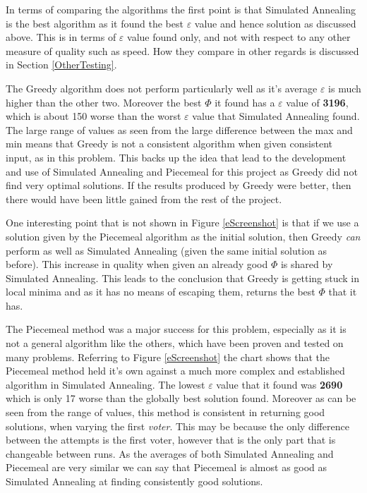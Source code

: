 \documentclass[12pt]{report}
\begin{document}
In terms of comparing the algorithms the first point is that Simulated Annealing is the best algorithm as it found the best $\varepsilon$ value and hence solution as discussed above. This is in terms of $\varepsilon$ value found only, and not with respect to any other measure of quality such as speed. How they compare in other regards is discussed in Section \ref{OtherTesting}.

The Greedy algorithm does not perform particularly well as it's average $\varepsilon$ is much higher than the other two. Moreover the best $\Phi$ it found has a $\varepsilon$ value of \textbf{3196}, which is about 150 worse than the worst $\varepsilon$ value that Simulated Annealing found. The large range of values as seen from the large difference between the max and min means that Greedy is not a consistent algorithm when given consistent input, as in this problem. This backs up the idea that lead to the development and use of Simulated Annealing and Piecemeal for this project as Greedy did not find very optimal solutions. If the results produced by Greedy were better, then there would have been little gained from the rest of the project. 

One interesting point that is not shown in Figure \ref{eScreenshot} is that if we use a solution given by the Piecemeal algorithm as the initial solution, then Greedy \textit{can} perform as well as Simulated Annealing (given the same initial solution as before). This increase in quality when given an already good $\Phi$ is shared by Simulated Annealing. This leads to the conclusion that Greedy is getting stuck in local minima and as it has no means of escaping them, returns the best $\Phi$ that it has.

The Piecemeal method was a major success for this problem, especially as it is not a general algorithm like the others, which have been proven and tested on many problems. Referring to Figure \ref{eScreenshot} the chart shows that the Piecemeal method held it's own against a much more complex and established algorithm in Simulated Annealing. The lowest $\varepsilon$ value that it found was \textbf{2690} which is only 17 worse than the globally best solution found. Moreover as can be seen from the range of values, this method is consistent in returning good solutions, when varying the first \textit{voter}. This may be because the only difference between the attempts is the first voter, however that is the only part that is changeable between runs. As the averages of both Simulated Annealing and Piecemeal are very similar we can say that Piecemeal is almost as good as Simulated Annealing at finding consistently good solutions.
\end{document}
